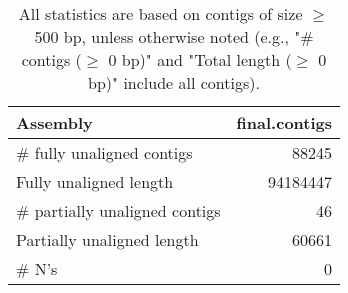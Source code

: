 \documentclass[12pt,a4paper]{article}
\begin{document}
\begin{table}[ht]
\begin{center}
\caption{All statistics are based on contigs of size $\geq$ 500 bp, unless otherwise noted (e.g., "\# contigs ($\geq$ 0 bp)" and "Total length ($\geq$ 0 bp)" include all contigs).}
\begin{tabular}{|l*{1}{|r}|}
\hline
Assembly & final.contigs \\ \hline
\# fully unaligned contigs & 88245 \\ \hline
Fully unaligned length & 94184447 \\ \hline
\# partially unaligned contigs & 46 \\ \hline
Partially unaligned length & 60661 \\ \hline
\# N's & 0 \\ \hline
\end{tabular}
\end{center}
\end{table}
\end{document}
